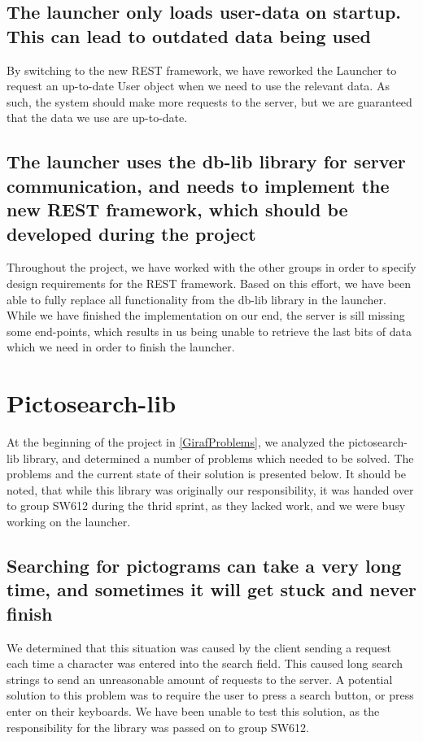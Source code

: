 \subsection*{The launcher only loads user-data on startup. This can lead to outdated data
being used}
By switching to the new REST framework, we have reworked the
Launcher to request an up-to-date User object when we need to use the relevant
data. As such, the system should make more requests to the server, but we are
guaranteed that the data we use are up-to-date.

\subsection*{The launcher uses the db-lib library for server communication, and needs to
implement the new REST framework, which should be developed during the project}
Throughout the project, we have worked with the other groups in order to
specify design requirements for the REST framework. Based on this effort, we
have been able to fully replace all functionality from the db-lib library in the
launcher. While we have finished the implementation on our end, the server is
sill missing some end-points, which results in us being unable to retrieve the
last bits of data which we need in order to finish the launcher.

\section{Pictosearch-lib}
At the beginning of the project in \autoref{GirafProblems}, we analyzed the
pictosearch-lib library, and determined a number of problems which needed to be
solved. The problems and the current state of their solution is presented
below. It should be noted, that while this library was originally our
responsibility, it was handed over to group SW612 during the thrid sprint, as
they lacked work, and we were busy working on the launcher. 

\subsection*{Searching for pictograms can take a very long time, and sometimes
it will get stuck and never finish}
We determined that this situation was caused by the client sending a request
each time a character was entered into the search field. This caused long search
strings to send an unreasonable amount of requests to the server. A
potential solution to this problem was to require the user to press a search
button, or press enter on their keyboards. We have been unable to test this
solution, as the responsibility for the library was passed on to group SW612.
  
